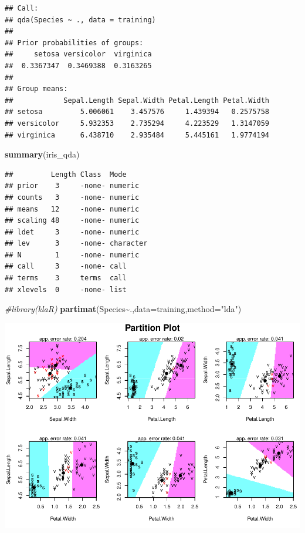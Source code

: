 \documentclass[
]{article}
\newenvironment{Shaded}{\begin{snugshade}}{\end{snugshade}}
\newcommand{\AttributeTok}[1]{\textcolor[rgb]{0.13,0.29,0.53}{#1}}
\newcommand{\CommentTok}[1]{\textcolor[rgb]{0.56,0.35,0.01}{\textit{#1}}}
\newcommand{\FunctionTok}[1]{\textcolor[rgb]{0.13,0.29,0.53}{\textbf{#1}}}
\newcommand{\NormalTok}[1]{#1}
\newcommand{\SpecialCharTok}[1]{\textcolor[rgb]{0.81,0.36,0.00}{\textbf{#1}}}
\newcommand{\StringTok}[1]{\textcolor[rgb]{0.31,0.60,0.02}{#1}}
\begin{document}
\begin{verbatim}
## Call:
## qda(Species ~ ., data = training)
## 
## Prior probabilities of groups:
##     setosa versicolor  virginica 
##  0.3367347  0.3469388  0.3163265 
## 
## Group means:
##            Sepal.Length Sepal.Width Petal.Length Petal.Width
## setosa         5.006061    3.457576     1.439394   0.2575758
## versicolor     5.932353    2.735294     4.223529   1.3147059
## virginica      6.438710    2.935484     5.445161   1.9774194
\end{verbatim}

\begin{Shaded}
\begin{Highlighting}[]
\FunctionTok{summary}\NormalTok{(iris\_qda)}
\end{Highlighting}
\end{Shaded}

\begin{verbatim}
##         Length Class  Mode     
## prior    3     -none- numeric  
## counts   3     -none- numeric  
## means   12     -none- numeric  
## scaling 48     -none- numeric  
## ldet     3     -none- numeric  
## lev      3     -none- character
## N        1     -none- numeric  
## call     3     -none- call     
## terms    3     terms  call     
## xlevels  0     -none- list
\end{verbatim}

\begin{Shaded}
\begin{Highlighting}[]
\CommentTok{\#library(klaR)}
\FunctionTok{partimat}\NormalTok{(Species}\SpecialCharTok{\textasciitilde{}}\NormalTok{.,}\AttributeTok{data=}\NormalTok{training,}\AttributeTok{method=}\StringTok{"lda"}\NormalTok{)}
\end{Highlighting}
\end{Shaded}

\includegraphics{LDA_QDA_IRIS_files/figure-latex/unnamed-chunk-6-1.pdf}
\end{document}
